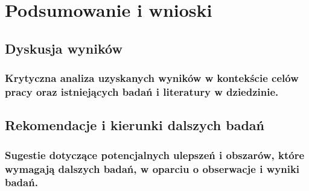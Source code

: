 \chapter{Podsumowanie i wnioski}
\section{Dyskusja wyników}
\subsection{Krytyczna analiza uzyskanych wyników w kontekście celów pracy oraz istniejących badań i literatury w dziedzinie.}
\section{Rekomendacje i kierunki dalszych badań}
\subsection{Sugestie dotyczące potencjalnych ulepszeń i obszarów, które wymagają dalszych badań, w oparciu o obserwacje i wyniki badań.}
